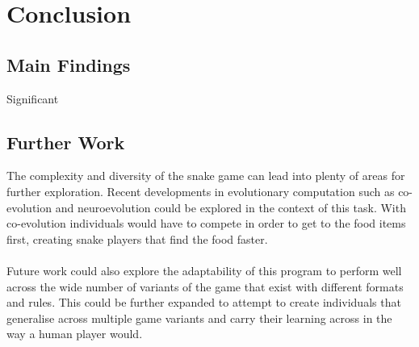 \documentclass{article}
\begin{document}





\section{Conclusion} %
\subsection{Main Findings}
Significant



\subsection{Further Work}
The complexity and diversity of the snake game can lead into plenty of areas for further exploration. Recent developments in evolutionary computation such as co-evolution and neuroevolution could be explored in the context of this task. With co-evolution individuals would have to compete in order to get to the food items first, creating snake players that find the food faster.
\\\\
Future work could also explore the adaptability of this program to perform well across the wide number of variants of the game that exist with different formats and rules. This could be further expanded to attempt to create individuals that generalise across multiple game variants and carry their learning across in the way a human player would.
\end{document}
